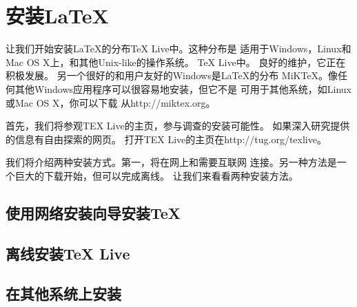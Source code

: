 \section{安装LaTeX}
让我们开始安装LaTeX的分布TeX Live中。这种分布是
适用于Windows，Linux和Mac OS X上，和其他Unix-like的操作系统。 TeX Live中。
良好的维护，它正在积极发展。
另一个很好的和用户友好的Windows是LaTeX的分布
MiKTeX。像任何其他Windows应用程序可以很容易地安装，但它不是
可用于其他系统，如Linux或Mac OS X，你可以下载
从http://miktex.org。

首先，我们将参观TEX Live的主页，参与调查的安装可能性。
如果深入研究提供的信息有自由探索的网页。
打开TEX Live的主页在http://tug.org/texlive。

我们将介绍两种安装方式。第一，将在网上和需要互联网
连接。另一种方法是一个巨大的下载开始，但可以完成离线。
让我们来看看两种安装方法。	

	\subsection{使用网络安装向导安装TeX}
	\subsection{离线安装TeX Live}
	\subsection{在其他系统上安装}

